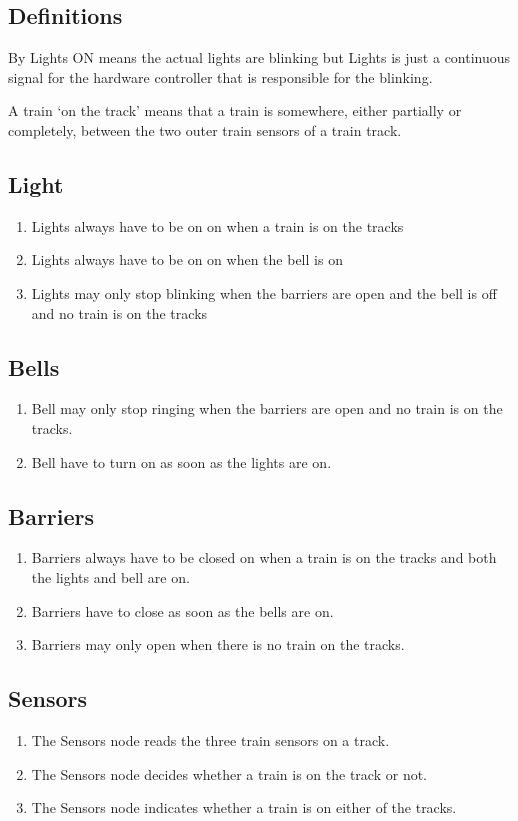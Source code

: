 \documentclass[final]{report}
\begin{document}
\subsection{Definitions}
By Lights ON means the actual lights are blinking but Lights is just a continuous signal for the hardware controller that is responsible for the blinking.

A train `on the track' means that a train is somewhere, either partially or completely, between the two outer train sensors of a train track.

\subsection{Light}
	\begin{enumerate}
		\item Lights always have to be on on when a train is on the tracks
		\item Lights always have to be on on when the bell is on
		\item Lights may only stop blinking when the barriers are open and the bell is off and no train is on the tracks
	\end{enumerate}

\subsection{Bells}
	\begin{enumerate}
		\item Bell may only stop ringing when the barriers are open and no train is on the tracks.
		\item Bell have to turn on as soon as the lights are on.
	\end{enumerate}

\subsection{Barriers}
	\begin{enumerate}
		\item Barriers always have to be closed on when a train is on the tracks and both the lights and bell are on.
		\item Barriers have to close as soon as the bells are on.
		\item Barriers may only open when there is no train on the tracks.
	\end{enumerate}

\subsection{Sensors}
	\begin{enumerate}
		\item The Sensors node reads the three train sensors on a track.
		\item The Sensors node decides whether a train is on the track or not.
		\item The Sensors node indicates whether a train is on either of the tracks.
	\end{enumerate}
\end{document}
